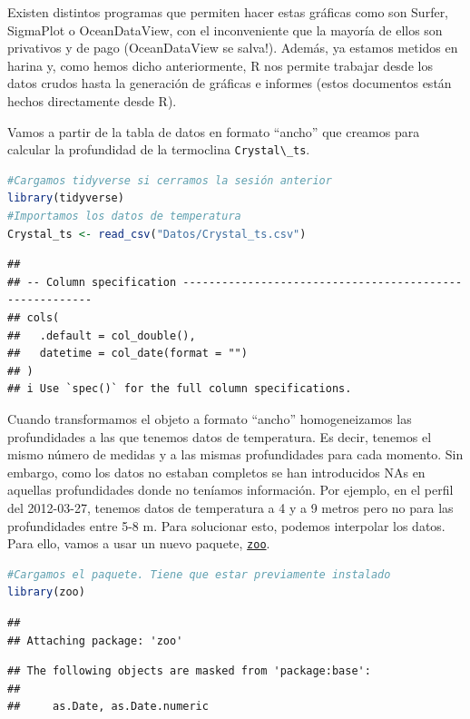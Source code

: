 \documentclass[
]{book}
\newcommand{\passthrough}[1]{#1}
\begin{document}
Existen distintos programas que permiten hacer estas gráficas como son Surfer, SigmaPlot o OceanDataView, con el inconveniente que la mayoría de ellos son privativos y de pago (OceanDataView se salva!). Además, ya estamos metidos en harina y, como hemos dicho anteriormente, R nos permite trabajar desde los datos crudos hasta la generación de gráficas e informes (estos documentos están hechos directamente desde R).

Vamos a partir de la tabla de datos en formato ``ancho'' que creamos para calcular la profundidad de la termoclina \passthrough{\lstinline!Crystal\_ts!}.

\begin{lstlisting}[language=R]
#Cargamos tidyverse si cerramos la sesión anterior
library(tidyverse)
#Importamos los datos de temperatura
Crystal_ts <- read_csv("Datos/Crystal_ts.csv")
\end{lstlisting}

\begin{lstlisting}
## 
## -- Column specification --------------------------------------------------------
## cols(
##   .default = col_double(),
##   datetime = col_date(format = "")
## )
## i Use `spec()` for the full column specifications.
\end{lstlisting}

Cuando transformamos el objeto a formato ``ancho'' homogeneizamos las profundidades a las que tenemos datos de temperatura. Es decir, tenemos el mismo número de medidas y a las mismas profundidades para cada momento. Sin embargo, como los datos no estaban completos se han introducidos NAs en aquellas profundidades donde no teníamos información. Por ejemplo, en el perfil del 2012-03-27, tenemos datos de temperatura a 4 y a 9 metros pero no para las profundidades entre 5-8 m. Para solucionar esto, podemos interpolar los datos. Para ello, vamos a usar un nuevo paquete, \href{https://cran.r-project.org/web/packages/zoo/zoo.pdf}{\passthrough{\lstinline!zoo!}}.

\begin{lstlisting}[language=R]
#Cargamos el paquete. Tiene que estar previamente instalado
library(zoo)
\end{lstlisting}

\begin{lstlisting}
## 
## Attaching package: 'zoo'
\end{lstlisting}

\begin{lstlisting}
## The following objects are masked from 'package:base':
## 
##     as.Date, as.Date.numeric
\end{lstlisting}
\end{document}
